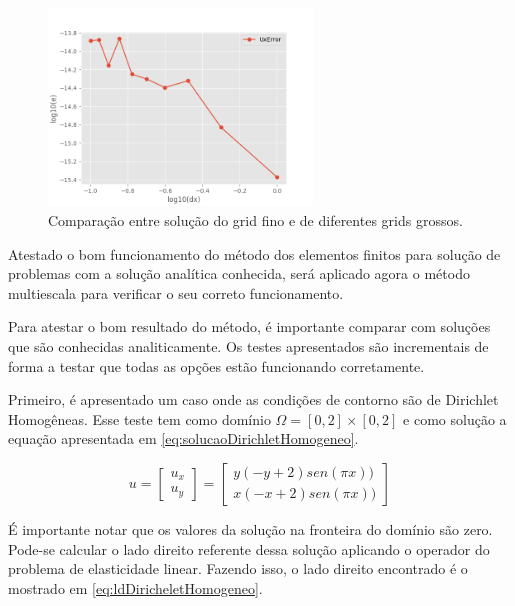 \begin{figure}[!htbp]
    \label{fig:SecondErrorTestSimpleShear}
    \centering
    \includegraphics[width=7cm]{chap08/figs/SecondErrorTestSimpleShear.png}
    \caption{Comparação entre solução do grid fino e de diferentes grids grossos.}
\end{figure}

Atestado o bom funcionamento do método dos elementos finitos para solução de problemas com a solução
analítica conhecida, será aplicado agora o método multiescala para verificar o seu correto funcionamento.



Para atestar o bom resultado do método, é importante comparar com soluções que são conhecidas analiticamente. Os testes apresentados são incrementais de forma a testar que todas as opções estão funcionando corretamente.



Primeiro, é apresentado um caso onde as condições de contorno são de Dirichlet Homogêneas. Esse teste tem como domínio $ \Omega = [0, 2] \times [0, 2]$  e como solução a equação apresentada em \ref{eq:solucaoDirichletHomogeneo}.

\begin{equation}\label{eq:solucaoDirichletHomogeneo}
u = 
\begin{bmatrix}
u_x
\\ 
u_y
\end{bmatrix}
=
\begin{bmatrix}
y(-y+2)sen(\pi x))
\\ 
x(-x+2)sen(\pi x))
\end{bmatrix}
\end{equation}

É importante notar que os valores da solução na fronteira do domínio são zero. Pode-se calcular o lado direito referente dessa solução aplicando o operador do problema de elasticidade linear. Fazendo isso, o lado direito encontrado é o mostrado em \ref{eq:ldDiricheletHomogeneo}.


